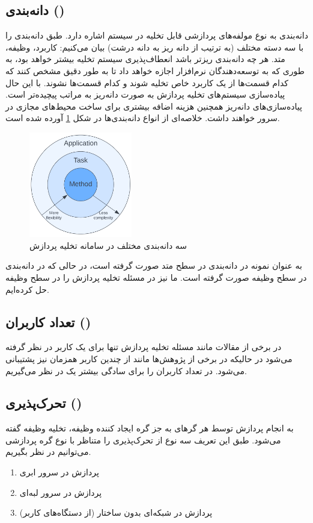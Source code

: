 \subsection*{دانه‌بندی ()}
دانه‌بندی به نوع مولفه‌های پردازشی قابل تخلیه در سیستم اشاره دارد. طبق \cite{wang2019} دانه‌بندی را با سه دسته مختلف (به ترتیب از دانه‌ ریز به دانه ‌درشت) بیان می‌کنیم: کاربرد، وظیفه، متد. هر چه دانه‌بندی ریزتر باشد انعطاف‌پذیری سیستم تخلیه بیشتر خواهد بود، به طوری که به توسعه‌دهندگان نرم‌افزار اجازه خواهد داد تا به طور دقیق مشخص کنند که کدام قسمت‌ها از یک کاربرد خاص تخلیه شوند و کدام قسمت‌ها نشوند. با این حال پیاده‌سازی سیستم‌های تخلیه پردازش به صورت دانه‌ریز به مراتب پیچیده‌تر است. پیاده‌سازی‌های دانه‌ریز همچنین هزینه اضافه بیشتری برای ساخت محیط‌های مجازی در سرور خواهند داشت. خلاصه‌ای از انواع دانه‌بندی‌ها در شکل \ref{fig:granularity} آورده شده است.
\begin{figure}[H]
	\centering
	\includegraphics[width=0.4\textwidth]{figures/granularity.png}
	\caption{سه دانه‌بندی مختلف در سامانه تخلیه پردازش}
	\label{fig:granularity}
\end{figure}
به عنوان نمونه در \cite{maui} دانه‌بندی در سطح متد صورت گرفته است، در حالی که در \cite{Liu} دانه‌بندی در سطح وظیفه صورت گرفته است. ما نیز در \CurrentProject مسئله تخلیه پردازش را در سطح وظیفه حل کرده‌ایم.
\newpage
\subsection*{تعداد کاربران ()}
در برخی از مقالات مانند \cite{Liu} مسئله تخلیه پردازش تنها برای یک کاربر در نظر گرفته می‌شود در حالیکه در برخی از پژوهش‌ها مانند \cite{multiuser} از چندین کاربر همزمان نیز پشتیبانی می‌شود. در \CurrentProject تعداد کاربران را برای سادگی بیشتر یک در نظر می‌گیریم.

\subsection*{تحرک‌پذیری ()}
به انجام پردازش توسط هر گرهای به جز گره ایجاد کننده وظیفه، تخلیه وظیفه گفته می‌شود. طبق این تعریف سه نوع از تحرک‌پذیری را متناظر با نوع گره پردازشی می‌توانیم در نظر بگیریم.
\begin{enumerate}
	\item پردازش در سرور ابری
	\item پردازش در سرور لبه‌ای
	\item پردازش در شبکه‌ای بدون ساختار (از دستگاه‌های کاربر)
\end{enumerate}

